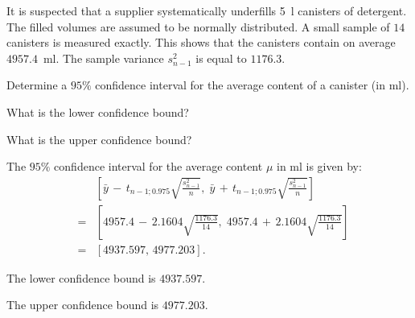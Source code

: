 

\begin{question}
It is suspected that a supplier systematically underfills 5~l canisters of detergent.
The filled volumes are assumed to be normally distributed. A small sample of $14$
canisters is measured exactly. This shows that the canisters contain on average
$4957.4$~ml. The sample variance $s^2_{n-1}$ is equal to $1176.3$.

Determine a $95\%$ confidence interval for the average content of
a canister (in ml).

\begin{answerlist}
\item What is the lower confidence bound?
\item What is the upper confidence bound?
\end{answerlist}
\end{question}


\begin{solution}
The $95\%$ confidence interval for the average content $\mu$
in ml is given by:
\begin{eqnarray*}
&   & \left[\bar{y} \, - \, t_{n-1;0.975}\sqrt{\frac{s_{n-1}^2}{n}}, \;
  \bar{y} \, + \, t_{n-1;0.975}\sqrt{\frac{s_{n-1}^2}{n}}\right] \\
& = & \left[ 4957.4 \, - \, 2.1604\sqrt{\frac{1176.3}{14}}, \;
             4957.4 \, + \, 2.1604\sqrt{\frac{1176.3}{14}}\right] \\
& = & \left[4937.597, \, 4977.203\right].
\end{eqnarray*}

\begin{answerlist}
\item The lower confidence bound is $4937.597$.
\item The upper confidence bound is $4977.203$.
\end{answerlist}
\end{solution}



